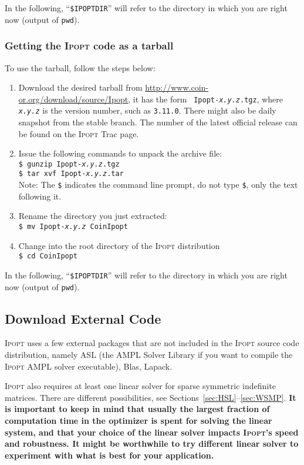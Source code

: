 \documentclass[10pt]{article}
\newcommand{\Ipopt}{\textsc{Ipopt}\xspace}
\begin{document}
In the following, ``\texttt{\$IPOPTDIR}'' will refer to the directory in
which you are right now (output of \texttt{pwd}).

\subsubsection{Getting the \Ipopt code as a tarball}

To use the tarball, follow the steps below:
\begin{enumerate}
\item Download the desired tarball from
  \url{http://www.coin-or.org/download/source/Ipopt}, it has the form {\tt
    Ipopt-{\em x.y.z}.tgz}, where {\tt\em x.y.z} is the version
  number, such as {\tt 3.11.0}.  There might also be daily snapshot
  from the stable branch.  The number of the latest official release
  can be found on the \Ipopt Trac page.
\item Issue the following commands to unpack the archive file: \\
\texttt{\$ gunzip Ipopt-{\em x.y.z}.tgz} \\
\texttt{\$ tar xvf Ipopt-{\em x.y.z}.tar} \\
Note: The {\tt \$} indicates the command line
prompt, do not type {\tt \$}, only the text following it.
\item Rename the directory you just extracted:\\
\texttt{\$ mv Ipopt-{\em x.y.z} CoinIpopt}
\item Change into the root directory of the \Ipopt distribution\\
{\tt \$ cd CoinIpopt}
\end{enumerate}

In the following, ``\texttt{\$IPOPTDIR}'' will refer to the directory in
which you are right now (output of \texttt{pwd}).

\subsection{Download External Code}\label{ExternalCode}
\Ipopt uses a few external packages that are not included in the
\Ipopt source code distribution, namely ASL (the AMPL Solver Library
if you want to compile the \Ipopt AMPL solver executable), Blas,
Lapack.

\Ipopt also requires at least one linear solver for sparse symmetric
indefinite matrices. There are
different possibilities, see Sections~\ref{sec:HSL}--\ref{sec:WSMP}.
{\bf It is important to keep in mind that usually
the largest fraction of computation time in the optimizer is spent for
solving the linear system, and that your choice of the linear solver
impacts \Ipopt's speed and robustness.  It might be worthwhile to try
different linear solver to experiment with what is best for your
application.}
\end{document}
